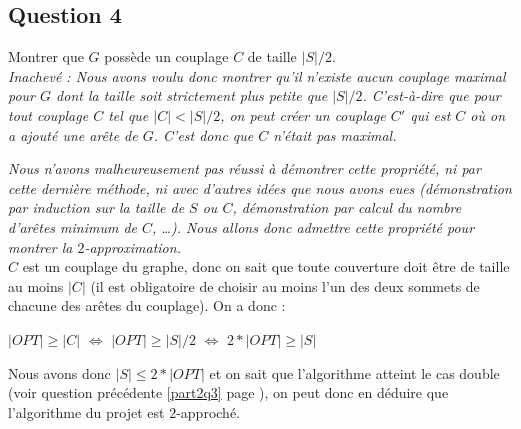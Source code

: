   \subsection{Question 4}
  Montrer que $G$ possède un couplage $C$ de taille $|S|/2$.\\
  
  \emph{Inachevé : Nous avons voulu donc montrer qu'il n'existe aucun
  couplage maximal pour $G$ dont la taille soit strictement plus petite
  que $|S|/2$. C'est-à-dire que pour tout couplage $C$ tel que $|C| <
  |S|/2$, on peut créer un couplage $C'$ qui est $C$ où on a ajouté une
  arête de $G$. C'est donc que $C$ n'était pas maximal.}

  \emph{Nous n'avons malheureusement pas réussi à démontrer cette
  propriété, ni par cette dernière méthode, ni avec d'autres idées que
  nous avons eues (démonstration par induction sur la taille de $S$ ou
  $C$, démonstration par calcul du nombre d'arêtes minimum de $C$,
  \dots). Nous allons donc admettre cette propriété pour montrer la
  $2$-approximation.}\\

  $C$ est un couplage du graphe, donc on sait que toute couverture doit
  être de taille au moins $|C|$ (il est obligatoire de choisir au moins
  l'un des deux sommets de chacune des arêtes du couplage). On a donc :
  \begin{center}
   $|OPT| \geq |C|$ $\iff$ $|OPT| \geq |S|/2$ $\iff$ $2 * |OPT| \geq
   |S|$
  \end{center}

  Nous avons donc $|S| \leq 2 * |OPT|$ et on sait que l'algorithme
  atteint le cas double (voir question précédente \ref{part2q3} page
  \pageref{part2q3}), on peut donc en déduire que l'algorithme du projet
  est $2$-approché.
  